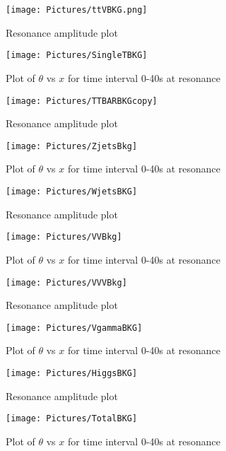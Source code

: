\begin{figure}[H]
\centering
\begin{minipage}{.5\textwidth}
  \centering
  \texttt{[image: Pictures/ttVBKG.png]}
  \caption{Resonance amplitude plot}
\end{minipage}%
\begin{minipage}{.5\textwidth}
  \centering
  \texttt{[image: Pictures/SingleTBKG]}
  \caption{Plot of \(\theta\) vs \(x\) for time interval 0-40s at resonance}
\end{minipage}
\end{figure}

\begin{figure}[H]
\centering
\begin{minipage}{.5\textwidth}
  \centering
  \texttt{[image: Pictures/TTBARBKGcopy]}
  \caption{Resonance amplitude plot}
\end{minipage}%
\begin{minipage}{.5\textwidth}
  \centering
  \texttt{[image: Pictures/ZjetsBkg]}
  \caption{Plot of \(\theta\) vs \(x\) for time interval 0-40s at resonance}
\end{minipage}
\end{figure}

\begin{figure}[H]
\centering
\begin{minipage}{.5\textwidth}
  \centering
  \texttt{[image: Pictures/WjetsBKG]}
  \caption{Resonance amplitude plot}
\end{minipage}%
\begin{minipage}{.5\textwidth}
  \centering
  \texttt{[image: Pictures/VVBkg]}
  \caption{Plot of \(\theta\) vs \(x\) for time interval 0-40s at resonance}
\end{minipage}
\end{figure}

\begin{figure}[H]
\centering
\begin{minipage}{.5\textwidth}
  \centering
  \texttt{[image: Pictures/VVVBkg]}
  \caption{Resonance amplitude plot}
\end{minipage}%
\begin{minipage}{.5\textwidth}
  \centering
  \texttt{[image: Pictures/VgammaBKG]}
  \caption{Plot of \(\theta\) vs \(x\) for time interval 0-40s at resonance}
\end{minipage}
\end{figure}

\begin{figure}[H]
\centering
\begin{minipage}{.5\textwidth}
  \centering
  \texttt{[image: Pictures/HiggsBKG]}
  \caption{Resonance amplitude plot}
\end{minipage}%
\begin{minipage}{.5\textwidth}
  \centering
  \texttt{[image: Pictures/TotalBKG]}
  \caption{Plot of \(\theta\) vs \(x\) for time interval 0-40s at resonance}
\end{minipage}
\end{figure}


